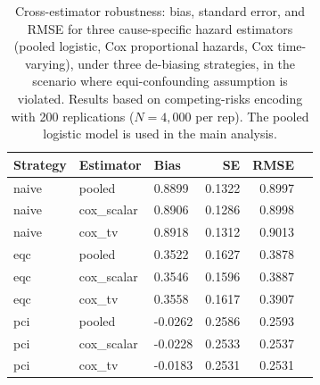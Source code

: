 \begin{table}
\centering
\begin{tabular}{lllrrr}
\toprule
Strategy & Estimator & Bias & SE & RMSE \\
\midrule
naive & pooled & 0.8899 & 0.1322 & 0.8997 \\
naive & cox_scalar & 0.8906 & 0.1286 & 0.8998 \\
naive & cox_tv & 0.8918 & 0.1312 & 0.9013 \\
\addlinespace
eqc & pooled & 0.3522 & 0.1627 & 0.3878 \\
eqc & cox_scalar & 0.3546 & 0.1596 & 0.3887 \\
eqc & cox_tv & 0.3558 & 0.1617 & 0.3907 \\
\addlinespace
pci & pooled & -0.0262 & 0.2586 & 0.2593 \\
pci & cox_scalar & -0.0228 & 0.2533 & 0.2537 \\
pci & cox_tv & -0.0183 & 0.2531 & 0.2531 \\
\bottomrule
\end{tabular}
\caption{Cross-estimator robustness: bias, standard error, and RMSE for three cause-specific hazard estimators (pooled logistic, Cox proportional hazards, Cox time-varying), under three de-biasing strategies, in the scenario where equi-confounding assumption is violated. Results based on competing-risks encoding with 200 replications ($N = 4{,}000$ per rep). The pooled logistic model is used in the main analysis.}
\label{tab:unified_cross_est}
\end{table}
